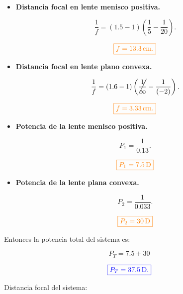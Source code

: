 \documentclass[a4paper,12pt]{article} %
\begin{document}
\begin{itemize}
	\item \textbf{Distancia focal en lente menisco positiva.}
	
	\[\frac{1}{f} = \left(1.5-1\right)\left(\frac{1}{5} - \frac{1}{20}\right).\]

	\[\textcolor{orange}{\boxed{f = 13.3 \, \mathrm{cm}.}}\]

	\vspace{\baselineskip}

	\item \textbf{Distancia focal en lente plano convexa.}
	
	\[\frac{1}{f} = \left(1.6-1\right)\left(\cancel{\frac{1}{\infty}} - \frac{1}{\left(-2\right)}\right).\]

	\[\textcolor{orange}{\boxed{f = 3.33 \, \mathrm{cm}.}}\]
\end{itemize}

\vspace{\baselineskip}

\begin{itemize}
	\item \textbf{Potencia de la lente menisco positiva.}
	
	\[P_1 = \frac{1}{0.13}.\]

	\[\textcolor{orange}{\boxed{P_1 = 7.5 \, \mathrm{D}}}\]

	\vspace{\baselineskip}

	\item \textbf{Potencia de la lente plana convexa.}
	
	\[P_2 = \frac{1}{0.033}.\]

	\[\textcolor{orange}{\boxed{P_2 = 30 \, \mathrm{D}}}\]
\end{itemize}

\vspace{\baselineskip}

\begin{justify}
	Entonces la potencia total del sistema es:
\end{justify}

\[ P_T = 7.5 + 30 \]

\vspace{\baselineskip}

\[\textcolor{blue}{\boxed{P_T = 37.5 \, \mathrm{D}.}}\]

\vspace{\baselineskip}

\begin{justify}
	Distancia focal del sistema:
\end{justify}
\end{document}
